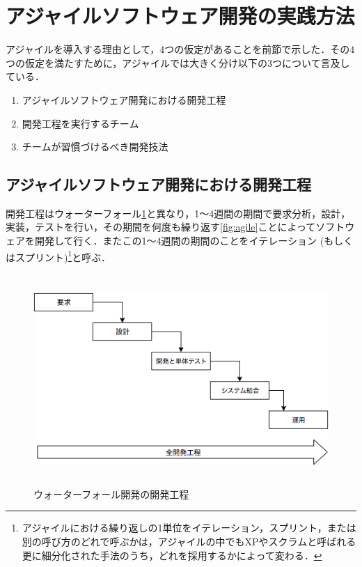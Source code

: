 \section{アジャイルソフトウェア開発の実践方法}

アジャイルを導入する理由として，4つの仮定があることを前節で示した．その4つの仮定を満たすために，アジャイルでは大きく分け以下の3つについて言及している．

\begin{enumerate}
  \item アジャイルソフトウェア開発における開発工程
  \item 開発工程を実行するチーム
  \item チームが習慣づけるべき開発技法
\end{enumerate}

\subsection{アジャイルソフトウェア開発における開発工程}

開発工程はウォーターフォール\ref{fig:waterfall}と異なり，1〜4週間の期間で要求分析，設計，実装，テストを行い，その期間を何度も繰り返す\ref{fig:agile}ことによってソフトウェアを開発して行く．またこの1〜4週間の期間のことをイテレーション (もしくはスプリント)\footnote{アジャイルにおける繰り返しの1単位をイテレーション，スプリント，または別の呼び方のどれで呼ぶかは，アジャイルの中でもXPやスクラムと呼ばれる更に細分化された手法のうち，どれを採用するかによって変わる．}と呼ぶ．

\begin{figure}[H]
\centering
\includegraphics[height=8cm]{./assets/images/waterfall.png}
\caption{ウォーターフォール開発の開発工程}
\label{fig:waterfall}
\end{figure}

